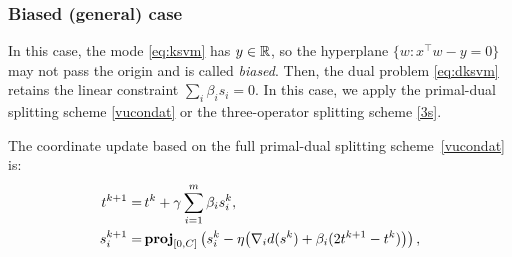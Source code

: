 \subsubsection*{Biased (general) case} In this case, the mode \eqref{eq:ksvm} has $y\in\mathbb{R}$, so the hyperplane $\{w:x^\top w-y=0\}$ may not pass the origin and is called \emph{biased}. Then,  the dual problem \eqref{eq:dksvm} retains the linear constraint $\sum_i \beta_i s_i=0$. In this case, we apply the primal-dual splitting scheme \eqref{vucondat} or the three-operator splitting scheme \eqref{3s}.

The coordinate update based on the full primal-dual splitting scheme~\eqref{vucondat} is:
\begin{subequations}\label{eq:pd-svm}
\begin{align}
t^{k+1}=&\,t^k+\gamma\sum_{i=1}^m \beta_i s_i^k,\label{eq:pd-svm-t}\\
s_i^{k+1}=&\,\prj_{[0,C]}\left(s_i^k-\eta\big(\nabla_i d(s^k)+\beta_i(2t^{k+1}-t^k)\big)\right), \label{eq:pd-svm-s}
\end{align}
\end{subequations}
